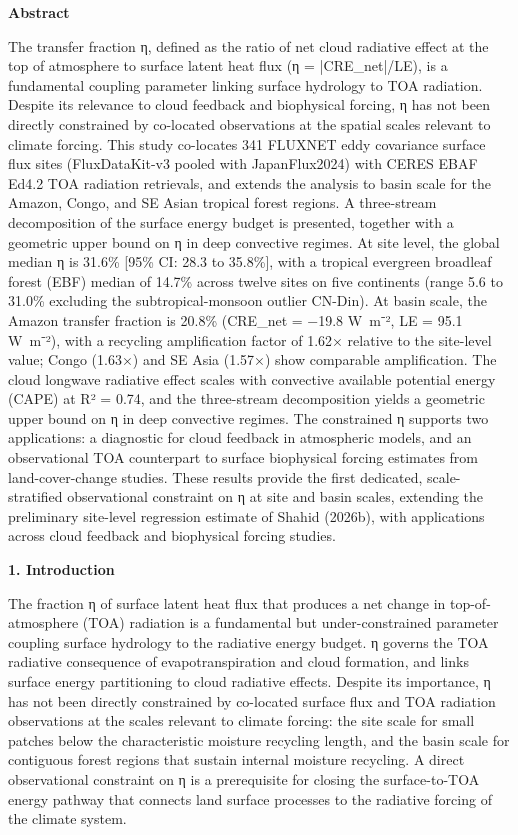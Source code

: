 \textbf{Abstract}

The transfer fraction η, defined as the ratio of net cloud radiative effect at the top of atmosphere to surface latent heat flux (η = |CRE\_net|/LE), is a fundamental coupling parameter linking surface hydrology to TOA radiation. Despite its relevance to cloud feedback and biophysical forcing, η has not been directly constrained by co-located observations at the spatial scales relevant to climate forcing. This study co-locates 341 FLUXNET eddy covariance surface flux sites (FluxDataKit-v3 pooled with JapanFlux2024) with CERES EBAF Ed4.2 TOA radiation retrievals, and extends the analysis to basin scale for the Amazon, Congo, and SE Asian tropical forest regions. A three-stream decomposition of the surface energy budget is presented, together with a geometric upper bound on η in deep convective regimes. At site level, the global median η is 31.6\% [95\% CI: 28.3 to 35.8\%], with a tropical evergreen broadleaf forest (EBF) median of 14.7\% across twelve sites on five continents (range 5.6 to 31.0\% excluding the subtropical-monsoon outlier CN-Din). At basin scale, the Amazon transfer fraction is 20.8\% (CRE\_net = −19.8 W~m⁻², LE = 95.1 W~m⁻²), with a recycling amplification factor of 1.62× relative to the site-level value; Congo (1.63×) and SE Asia (1.57×) show comparable amplification. The cloud longwave radiative effect scales with convective available potential energy (CAPE) at R² = 0.74, and the three-stream decomposition yields a geometric upper bound on η in deep convective regimes. The constrained η supports two applications: a diagnostic for cloud feedback in atmospheric models, and an observational TOA counterpart to surface biophysical forcing estimates from land-cover-change studies. These results provide the first dedicated, scale-stratified observational constraint on η at site and basin scales, extending the preliminary site-level regression estimate of Shahid (2026b), with applications across cloud feedback and biophysical forcing studies.

\textbf{1. Introduction}

The fraction η of surface latent heat flux that produces a net change in top-of-atmosphere (TOA) radiation is a fundamental but under-constrained parameter coupling surface hydrology to the radiative energy budget. η governs the TOA radiative consequence of evapotranspiration and cloud formation, and links surface energy partitioning to cloud radiative effects. Despite its importance, η has not been directly constrained by co-located surface flux and TOA radiation observations at the scales relevant to climate forcing: the site scale for small patches below the characteristic moisture recycling length, and the basin scale for contiguous forest regions that sustain internal moisture recycling. A direct observational constraint on η is a prerequisite for closing the surface-to-TOA energy pathway that connects land surface processes to the radiative forcing of the climate system.

